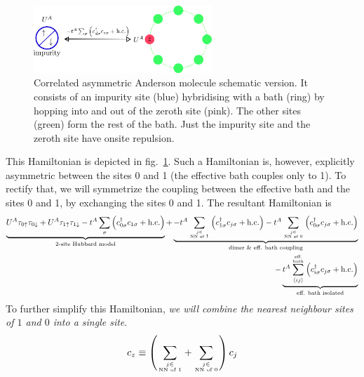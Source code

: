 \documentclass{report}
\numberwithin{equation}{section}
\begin{document}
 \begin{figure}[htpb]
 	\centering
 	\includegraphics[width=0.6\textwidth]{../figures/gen_siam.png}
 	\caption{Correlated asymmetric Anderson molecule schematic version. It consists of an impurity site (blue) hybridising with a bath (ring) by hopping into and out of the zeroth site (pink). The other sites (green) form the rest of the bath. Just the impurity site and the zeroth site have onsite repulsion.}
 	\label{and_mol}
 \end{figure}
 This Hamiltonian is depicted in fig.~\ref{and_mol}. Such a Hamiltonian is, however, explicitly asymmetric between the sites 0 and 1 (the effective bath couples only to 1). To rectify that, we will symmetrize the coupling between the effective bath and the sites 0 and 1, by exchanging the sites 0 and 1. The resultant Hamiltonian is
 \begin{equation}\begin{aligned}
 	\underbrace{U^A\tau_{0 \uparrow}\tau_{0 \downarrow} + U^A\tau_{1 \uparrow}\tau_{1 \downarrow} - t^A\sum_{\sigma}\left(c^\dagger_{0\sigma}c_{1\sigma} + \text{h.c.}\right)}_\text{2-site Hubbard model} +\underbrace{- t^A\sum_{j \in \atop{\text{NN of 1}}}\left(c^\dagger_{1\sigma}c_{j\sigma} + \text{h.c.}\right)- t^A\sum_{j \in \atop{\text{NN of 0}}}\left(c^\dagger_{0\sigma}c_{j\sigma} + \text{h.c.}\right)}_\text{dimer \& eff. bath coupling} \\
 	- \underbrace{t^A \sum_{\left<ij \right>}^{\text{eff.} \atop{\text{bath}}}\left(c^\dagger_{i\sigma}c_{j\sigma} + \text{h.c.}\right)}_\text{eff. bath isolated}
 \end{aligned}\end{equation}
 To further simplify this Hamiltonian, \textit{we will combine the nearest neighbour sites of \(1\) and \(0\) into a single site}.
 \begin{equation}\begin{aligned}
 	c_z \equiv \left(\sum_{j \in \atop{\text{NN of 1}}} + \sum_{j \in \atop{\text{NN of 0}}}\right)c_{j}
 \end{aligned}\end{equation}
\end{document}
